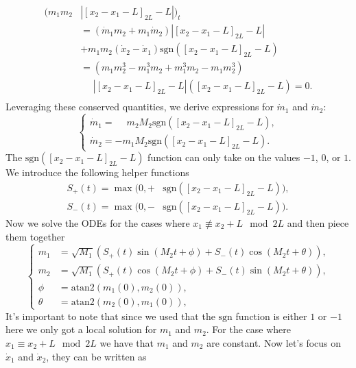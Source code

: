 \documentclass[english,master]{liumaiex}
\theoremstyle{plain}
\theoremstyle{definition}
\newcommand{\sgn}{\text{sgn}}
\begin{document}
\begin{equation}
\begin{aligned}
	(m_1m_2&|[x_2 - x_1 - L]_{2L} - L|)_t \\
	&= (\dot{m}_1m_2 + m_1\dot{m}_2)|[x_2 - x_1 - L]_{2L} - L| \\
	&+ m_1m_2(\dot{x}_2 - \dot{x}_1)\sgn([x_2 - x_1 - L]_{2L} - L) \\
	&=(m_1m_2^3 - m_1^3m_2 + m_1^3m_2 - m_1m_2^3)\\
	&\phantom{=}|[x_2 - x_1 - L]_{2L} - L|([x_2 - x_1 - L]_{2L} - L) =0. \\
\end{aligned}
\end{equation}
%
Leveraging these conserved quantities, we derive expressions for $\dot{m}_1$ and $\dot{m}_2$:
\begin{equation}
\left\{ \begin{aligned}
	\dot{m}_1 = \phantom{-}m_2M_2 \sgn([x_2 - x_1 - L]_{2L} - L), \\
	\dot{m}_2 = -m_1M_2 \sgn([x_2 - x_1 - L]_{2L} - L).
\end{aligned} \right.
\end{equation}
%
The $\sgn([x_2 - x_1 - L]_{2L} - L)$ function can only take on the values $-1$, $0$, or $1$. We introduce the following helper functions
\begin{equation}
\begin{aligned}
	S_+(t) = \max(0, + &\sgn([x_2 - x_1 - L]_{2L} - L)), \\
	S_-(t) = \max(0, - &\sgn([x_2 - x_1 - L]_{2L} - L)).
\end{aligned}
\end{equation}
Now we solve the ODEs for the cases where $x_1 \not \equiv x_2 + L \mod 2L$ and then piece them together
\begin{equation}
\left\{ \begin{aligned}
	m_1 &= \sqrt{M_1} (S_+(t)\sin(M_2 t + \phi) + S_-(t)\cos(M_2 t + \theta)), \\
	m_2 &= \sqrt{M_1} (S_+(t)\cos(M_2 t + \phi) + S_-(t)\sin(M_2 t + \theta)), \\
	\phi &= \text{atan2}(m_1(0),m_2(0)), \\
	\theta &= \text{atan2}(m_2(0),m_1(0)),
\end{aligned} \right.
\end{equation}
It's important to note that since we used that the $\sgn$ function is either $1$ or $-1$ here we only got a local solution for $m_1$ and $m_2$. For the case where $x_1 \equiv x_2 + L \mod 2L$ we have that $m_1$ and $m_2$ are constant. Now let's focus on $\dot{x}_1$ and $\dot{x}_2$, they can be written as
\end{document}

